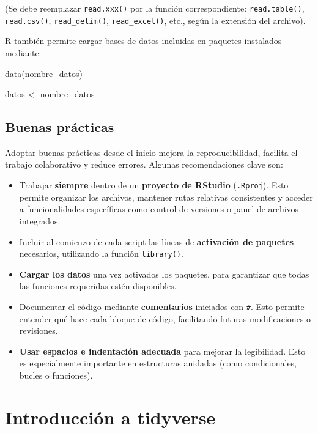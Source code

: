 \documentclass[
  spanish,
  letterpaper,
  DIV=11,
  numbers=noendperiod]{scrreprt}
\newenvironment{Shaded}{\begin{snugshade}}{\end{snugshade}}
\newcommand{\FunctionTok}[1]{\textcolor[rgb]{0.28,0.35,0.67}{#1}}
\newcommand{\NormalTok}[1]{\textcolor[rgb]{0.00,0.23,0.31}{#1}}
\newcommand{\OtherTok}[1]{\textcolor[rgb]{0.00,0.23,0.31}{#1}}
\begin{document}
(Se debe reemplazar \texttt{read.xxx()} por la función correspondiente:
\texttt{read.table()}, \texttt{read.csv()}, \texttt{read\_delim()},
\texttt{read\_excel()}, etc., según la extensión del archivo).

R también permite cargar bases de datos incluidas en paquetes instalados
mediante:

\begin{Shaded}
\begin{Highlighting}[]
\FunctionTok{data}\NormalTok{(nombre\_datos)}

\NormalTok{datos }\OtherTok{\textless{}{-}}\NormalTok{ nombre\_datos}
\end{Highlighting}
\end{Shaded}

\section{Buenas prácticas}\label{buenas-pruxe1cticas}

Adoptar buenas prácticas desde el inicio mejora la reproducibilidad,
facilita el trabajo colaborativo y reduce errores. Algunas
recomendaciones clave son:

\begin{itemize}
\item
  Trabajar \textbf{siempre} dentro de un \textbf{proyecto de RStudio}
  (\texttt{.Rproj}). Esto permite organizar los archivos, mantener rutas
  relativas consistentes y acceder a funcionalidades específicas como
  control de versiones o panel de archivos integrados.
\item
  Incluir al comienzo de cada script las líneas de \textbf{activación de
  paquetes} necesarios, utilizando la función \texttt{library()}.
\item
  \textbf{Cargar los datos} una vez activados los paquetes, para
  garantizar que todas las funciones requeridas estén disponibles.
\item
  Documentar el código mediante \textbf{comentarios} iniciados con
  \texttt{\#}. Esto permite entender qué hace cada bloque de código,
  facilitando futuras modificaciones o revisiones.
\item
  \textbf{Usar espacios e indentación adecuada} para mejorar la
  legibilidad. Esto es especialmente importante en estructuras anidadas
  (como condicionales, bucles o funciones).
\end{itemize}

\chapter{Introducción a tidyverse}\label{introducciuxf3n-a-tidyverse}
\end{document}
